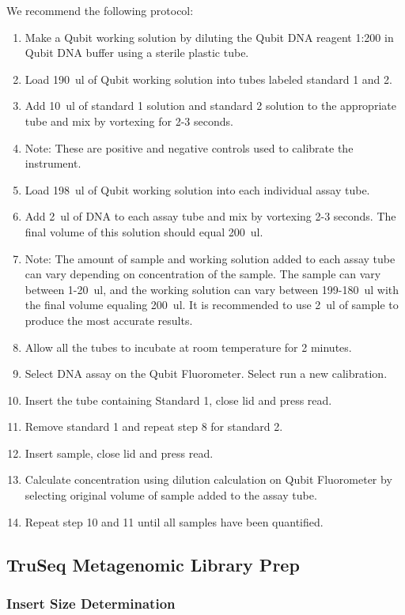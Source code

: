 \documentclass[graybox]{svmult}
\begin{document}
We recommend the following protocol:
\begin{enumerate}
\item{     Make a Qubit working solution by diluting the Qubit DNA reagent 1:200 in Qubit DNA buffer using a sterile plastic tube.}
\item{       Load 190~ul of Qubit working solution into tubes labeled standard 1 and 2.}
\item{       Add 10~ul of standard 1 solution and standard 2 solution to the appropriate tube and mix by vortexing for 2-3 seconds.}
\item{         Note: These are positive and negative controls used to calibrate the instrument.}
\item{       Load 198~ul of Qubit working solution into each individual assay tube.}
\item{       Add 2~ul of DNA to each assay tube and mix by vortexing 2-3 seconds. The final volume of this solution should equal 200~ul.}
\item{        Note: The amount of sample and working solution added to each assay tube can vary depending on concentration of the sample. The sample can vary between 1-20~ul, and the working solution can vary between 199-180~ul with the final volume equaling 200~ul. It is recommended to use 2~ul of sample to produce the most accurate results.}
\item{       Allow all the tubes to incubate at room temperature for 2 minutes.}
\item{       Select DNA assay on the Qubit Fluorometer. Select run a new calibration.}
\item{       Insert the tube containing Standard 1, close lid and press read.}
\item{       Remove standard 1 and repeat step 8 for standard 2.}
\item{      Insert sample, close lid and press read.}
\item{      Calculate concentration using dilution calculation on Qubit Fluorometer by selecting original volume of sample added to the assay tube.}
\item{      Repeat step 10 and 11 until all samples have been quantified.}
\end{enumerate}

\subsection{TruSeq Metagenomic Library Prep}
\subsubsection{ Insert Size Determination}
\end{document}
